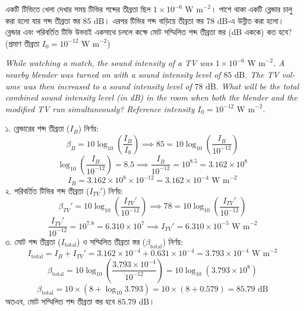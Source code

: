 \documentclass[12pt, a4paper]{article}
\begin{document}
\vspace{1.5em}

\begin{tcolorbox}[questionbox={প্রশ্ন (Question) 7}]
\noindent
একটি টিভিতে খেলা দেখার সময় টিভির শব্দের তীব্রতা ছিল $1 \times 10^{-6}\text{ W m}^{-2}$। পাশে থাকা একটি ব্লেন্ডার চালু করা হলো যার শব্দ তীব্রতা স্তর $85\text{ dB}$। এরপর টিভির শব্দ বাড়িয়ে তীব্রতা স্তর $78\text{ dB}$-এ উন্নীত করা হলো। ব্লেন্ডার এবং পরিবর্তিত টিভি উভয়ই একসাথে চললে কক্ষে মোট সম্মিলিত শব্দ তীব্রতা স্তর (dB এককে) কত হবে? (প্রমাণ তীব্রতা $I_0 = 10^{-12}\text{ W m}^{-2}$)

\vspace{0.8em}
\begin{english}
\noindent\textit{\color{darkgray}
While watching a match, the sound intensity of a TV was $1 \times 10^{-6}\text{ W m}^{-2}$. A nearby blender was turned on with a sound intensity level of $85\text{ dB}$. The TV volume was then increased to a sound intensity level of $78\text{ dB}$. What will be the total combined sound intensity level (in dB) in the room when both the blender and the modified TV run simultaneously? Reference intensity $I_0 = 10^{-12}\text{ W m}^{-2}$.
}
\end{english}
\end{tcolorbox}

\vspace{1em}

\begin{tcolorbox}[solutionbox={সমাধান (Solution)}]
\noindent
১. ব্লেন্ডারের শব্দ তীব্রতা ($I_B$) নির্ণয়:
\[ \beta_B = 10 \log_{10} \left(\frac{I_B}{I_0}\right) \implies 85 = 10 \log_{10} \left(\frac{I_B}{10^{-12}}\right) \]
\[ \log_{10} \left(\frac{I_B}{10^{-12}}\right) = 8.5 \implies \frac{I_B}{10^{-12}} = 10^{8.5} = 3.162 \times 10^8 \]
\[ I_B = 3.162 \times 10^8 \times 10^{-12} = 3.162 \times 10^{-4}\text{ W m}^{-2} \]
২. পরিবর্তিত টিভির শব্দ তীব্রতা ($I_{TV}'$) নির্ণয়:
\[ \beta_{TV}' = 10 \log_{10} \left(\frac{I_{TV}'}{10^{-12}}\right) \implies 78 = 10 \log_{10} \left(\frac{I_{TV}'}{10^{-12}}\right) \]
\[ \frac{I_{TV}'}{10^{-12}} = 10^{7.8} = 6.310 \times 10^7 \implies I_{TV}' = 6.310 \times 10^{-5}\text{ W m}^{-2} \]
৩. মোট শব্দ তীব্রতা ($I_{\text{total}}$) ও সম্মিলিত তীব্রতা স্তর ($\beta_{\text{total}}$) নির্ণয়:
\[ I_{\text{total}} = I_B + I_{TV}' = 3.162 \times 10^{-4} + 0.631 \times 10^{-4} = 3.793 \times 10^{-4}\text{ W m}^{-2} \]
\[ \beta_{\text{total}} = 10 \log_{10} \left(\frac{3.793 \times 10^{-4}}{10^{-12}}\right) = 10 \log_{10}(3.793 \times 10^8) \]
\[ \beta_{\text{total}} = 10 \times (8 + \log_{10} 3.793) = 10 \times (8 + 0.579) = 85.79\text{ dB} \]
অতএব, মোট সম্মিলিত শব্দ তীব্রতা স্তর হবে $85.79\text{ dB}$।
\end{tcolorbox}
\end{document}
